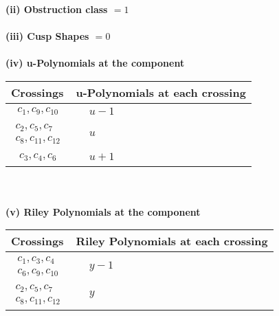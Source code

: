 \documentclass[1p]{elsarticle_modified}
\theoremstyle{definition}
\begin{document}
\flushleft \textbf{(ii) Obstruction class $= 1$}\\~\\
\flushleft \textbf{(iii) Cusp Shapes $= 0$}\\~\\
\newpage\renewcommand{\arraystretch}{1}
\flushleft \textbf{(iv) u-Polynomials at the component}\newline \\
\begin{tabular}{m{50pt}|m{274pt}}
Crossings & \hspace{64pt}u-Polynomials at each crossing \\
\hline $$\begin{aligned}c_{1},c_{9},c_{10}\end{aligned}$$&$\begin{aligned}
&u-1
\end{aligned}$\\
\hline $$\begin{aligned}c_{2},c_{5},c_{7}\\c_{8},c_{11},c_{12}\end{aligned}$$&$\begin{aligned}
&u
\end{aligned}$\\
\hline $$\begin{aligned}c_{3},c_{4},c_{6}\end{aligned}$$&$\begin{aligned}
&u+1
\end{aligned}$\\
\hline
\end{tabular}\\~\\
\newpage\renewcommand{\arraystretch}{1}
\flushleft \textbf{(v) Riley Polynomials at the component}\newline \\
\begin{tabular}{m{50pt}|m{274pt}}
Crossings & \hspace{64pt}Riley Polynomials at each crossing \\
\hline $$\begin{aligned}c_{1},c_{3},c_{4}\\c_{6},c_{9},c_{10}\end{aligned}$$&$\begin{aligned}
&y-1
\end{aligned}$\\
\hline $$\begin{aligned}c_{2},c_{5},c_{7}\\c_{8},c_{11},c_{12}\end{aligned}$$&$\begin{aligned}
&y
\end{aligned}$\\
\hline
\end{tabular}\\~\\
\end{document}
